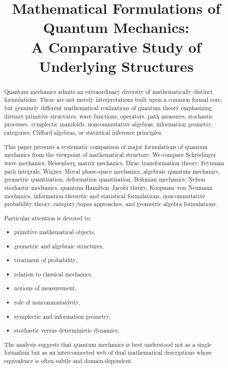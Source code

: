 \documentclass[11pt]{article}
\title{Mathematical Formulations of Quantum Mechanics:\\
A Comparative Study of Underlying Structures}
\author{}
\date{}
\begin{document}
\maketitle

\begin{abstract}

Quantum mechanics admits an extraordinary diversity of mathematically distinct formulations. These are not merely interpretations built upon a common formal core, but genuinely different mathematical realizations of quantum theory emphasizing distinct primitive structures: wave functions, operators, path measures, stochastic processes, symplectic manifolds, noncommutative algebras, information geometry, categories, Clifford algebras, or statistical inference principles. 

This paper presents a systematic comparison of major formulations of quantum mechanics from the viewpoint of mathematical structure. We compare Schr\"odinger wave mechanics, Heisenberg matrix mechanics, Dirac transformation theory, Feynman path integrals, Wigner--Moyal phase-space mechanics, algebraic quantum mechanics, geometric quantization, deformation quantization, Bohmian mechanics, Nelson stochastic mechanics, quantum Hamilton--Jacobi theory, Koopman--von Neumann mechanics, information-theoretic and statistical formulations, noncommutative probability theory, category/topos approaches, and geometric algebra formulations.

Particular attention is devoted to:
\begin{itemize}
\item primitive mathematical objects,
\item geometric and algebraic structures,
\item treatment of probability,
\item relation to classical mechanics,
\item notions of measurement,
\item role of noncommutativity,
\item symplectic and information geometry,
\item stochastic versus deterministic dynamics.
\end{itemize}

The analysis suggests that quantum mechanics is best understood not as a single formalism but as an interconnected web of dual mathematical descriptions whose equivalence is often subtle and domain-dependent.

\end{abstract}
\end{document}

